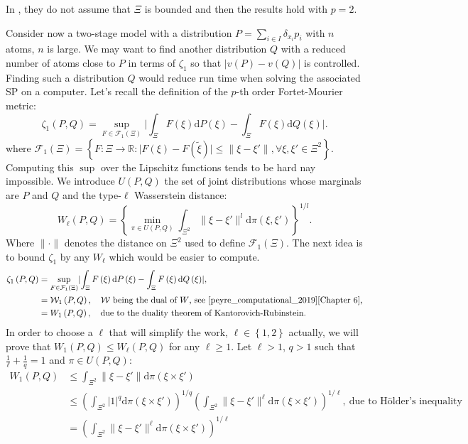\documentclass{amsart}
\newcommand{\RR}{\mathbb{R}}
\begin{document}
\begin{remark}
    In \cite{romisch_stability_2003}, they do not assume that $\Xi$ is bounded and then the results hold with $p=2$.
\end{remark}
Consider now a two-stage model with a distribution $P=\sum_{i\in I}\delta_{x_i}p_i$ with $n$ atoms, $n$ is large. We may want to find another distribution $Q$ with a reduced number of atoms close to $P$ in terms of $\zeta_1$ so that $\lvert v\left(P\right)-v\left(Q\right)\rvert$ is controlled. Finding such a distribution $Q$ would reduce run time when solving the associated SP on a computer. Let's recall the definition of the $p$-th order Fortet-Mourier metric:
$$
\zeta_1\left(P,Q\right)=\sup_{F\in\mathcal{F}_1\left(\Xi\right)}\lvert \int_\Xi F\left(\xi\right)\text{d}P\left(\xi\right)-\int_\Xi F\left(\xi\right)\text{d}Q\left(\xi\right)\rvert.
$$
where $\mathcal{F}_1\left(\Xi\right)=\left\{F:\Xi\to \RR: \lvert F\left(\xi\right)-F\left(\tilde{\xi}\right)\rvert \leq \lVert\xi-\xi'\rVert, \forall \xi,\xi'\in \Xi^2 \right\}$. Computing this $\sup$ over the Lipschitz functions tends to be hard nay impossible. We introduce $U\left(P,Q\right)$ the set of joint distributions whose marginals are $P$ and $Q$ and the type-$\ell$ Wasserstein distance: $$
W_\ell\left(P,Q\right) = \left\{\min_{\pi\in U\left(P,Q\right)}\int_{\Xi^2}\lVert \xi-\xi'\rVert^l \text{d}\pi\left(\xi,\xi'\right)\right\}^{1/l}.$$
Where $\lVert \cdot \rVert$ denotes the distance on $\Xi^2$ used to define $\mathcal{F}_1\left(\Xi\right)$. The next idea is to bound $\zeta_1$ by any $W_\ell$ which would be easier to compute.
\begin{align*}
    \zeta_1\left(P,Q\right)&= \sup_{F\in\mathcal{F}_1\left(\Xi\right)}\lvert \int_\Xi F\left(\xi\right)\text{d}P\left(\xi\right)-\int_\Xi F\left(\xi\right)\text{d}Q\left(\xi\right)\rvert, \\
    &=\mathcal{W}_1\left(P,Q\right), \quad \mathcal{W} \text{ being the dual of } W \text{, see \cite{peyre_computational_2019}[Chapter 6],}\\
    &= W_1\left(P,Q\right), \quad \text{due to the duality theorem of Kantorovich-Rubinstein.}
\end{align*}
In order to choose a $\ell$ that will simplify the work, $\ell\in\left\{1,2\right\}$ actually, we will prove that $W_1\left(P,Q\right)\leq W_\ell\left(P,Q\right)$ for any $\ell \geq 1$.  Let $\ell >1$, $q>1$ such that $\frac{1}{\ell}+\frac{1}{q}=1$ and $\pi\in U\left(P,Q\right)$:
\begin{align*}
W_1\left(P,Q\right)&\leq \int_{\Xi^2}\lVert \xi-\xi'\rVert \text{d}\pi\left(\xi\times\xi'\right) \\ &\leq \left(\int_{\Xi^2} \lvert 1\rvert^{q}\text{d}\pi\left(\xi\times\xi'\right)\right)^{1/q} \left(\int_{\Xi^2}\lVert \xi-\xi'\rVert^\ell\text{d}\pi\left(\xi\times\xi'\right)\right)^{1/\ell}, \: \text{due to Hölder's inequality} \\
&=\left(\int_{\Xi^2}\lVert \xi-\xi'\rVert^\ell\text{d}\pi\left(\xi\times\xi'\right)\right)^{1/\ell}
\end{align*}
\end{document}
